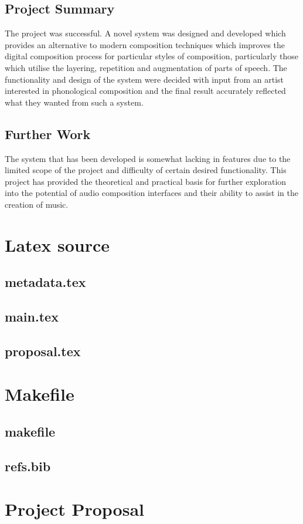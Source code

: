 \documentclass[12pt,a4paper,twoside,openright]{report}
\begin{document}
\section{Project Summary}
The project was successful. A novel system was designed and developed which provides an alternative to modern composition techniques which improves the digital composition process for particular styles of composition, particularly those which utilise the layering, repetition and augmentation of parts of speech. The functionality and design of the system were decided with input from an artist interested in phonological composition and the final result accurately reflected what they wanted from such a system.

\section{Further Work}
The system that has been developed is somewhat lacking in features due to the limited scope of the project and difficulty of certain desired functionality. This project has provided the theoretical and practical basis for further exploration into the potential of audio composition interfaces and their ability to assist in the creation of music.


\appendix

\chapter{Latex source}

\section{metadata.tex}
{\scriptsize}

\section{main.tex}
{\scriptsize}

\section{proposal.tex}
{\scriptsize}

\chapter{Makefile}

\section{makefile}\label{makefile}
{\scriptsize}

\section{refs.bib}
{\scriptsize}


\chapter{Project Proposal}


\end{document}
